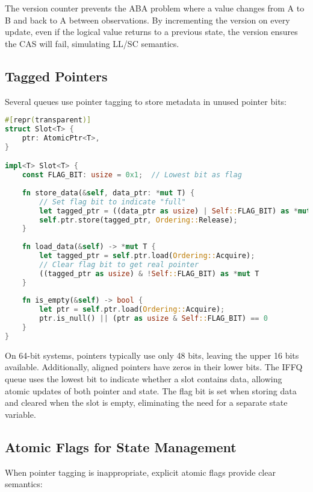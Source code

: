 The version counter prevents the ABA problem where a value changes from A to B and back to A between observations. By incrementing the version on every update, even if the logical value returns to a previous state, the version ensures the CAS will fail, simulating LL/SC semantics.

\subsection{Tagged Pointers}

Several queues use pointer tagging to store metadata in unused pointer bits:

\begin{lstlisting}[language=Rust, style=boxed, caption={Tagged pointer implementation}, label={lst:tagged-pointers}]
#[repr(transparent)]
struct Slot<T> {
    ptr: AtomicPtr<T>,
}

impl<T> Slot<T> {
    const FLAG_BIT: usize = 0x1;  // Lowest bit as flag
    
    fn store_data(&self, data_ptr: *mut T) {
        // Set flag bit to indicate "full"
        let tagged_ptr = ((data_ptr as usize) | Self::FLAG_BIT) as *mut T;
        self.ptr.store(tagged_ptr, Ordering::Release);
    }
    
    fn load_data(&self) -> *mut T {
        let tagged_ptr = self.ptr.load(Ordering::Acquire);
        // Clear flag bit to get real pointer
        ((tagged_ptr as usize) & !Self::FLAG_BIT) as *mut T
    }
    
    fn is_empty(&self) -> bool {
        let ptr = self.ptr.load(Ordering::Acquire);
        ptr.is_null() || (ptr as usize & Self::FLAG_BIT) == 0
    }
}
\end{lstlisting}

On 64-bit systems, pointers typically use only 48 bits, leaving the upper 16 bits available. Additionally, aligned pointers have zeros in their lower bits. The IFFQ queue uses the lowest bit to indicate whether a slot contains data, allowing atomic updates of both pointer and state. The flag bit is set when storing data and cleared when the slot is empty, eliminating the need for a separate state variable.

\subsection{Atomic Flags for State Management}

When pointer tagging is inappropriate, explicit atomic flags provide clear semantics:

